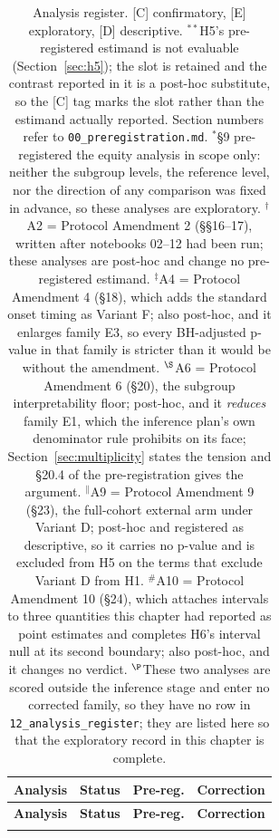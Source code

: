 {\footnotesize\setlength{\tabcolsep}{4pt}
\begin{longtable}{p{5.0cm}lp{1.9cm}p{4.2cm}}
    \caption{Analysis register. [C] confirmatory, [E] exploratory,
    [D] descriptive. $^{**}$H5's pre-registered estimand is not evaluable
    (Section~\ref{sec:h5}); the slot is retained and the contrast reported in
    it is a post-hoc substitute, so the [C] tag marks the slot rather than the
    estimand actually reported. Section numbers refer to
    \texttt{00\_preregistration.md}. $^*$\S9 pre-registered the equity analysis
    in scope only: neither the subgroup levels, the reference level, nor the
    direction of any comparison was fixed in advance, so these analyses are
    exploratory. $^\dagger$A2 = Protocol Amendment 2 (\S\S16--17), written after
    notebooks 02--12 had been run; these analyses are post-hoc and change no
    pre-registered estimand. $^\ddagger$A4 = Protocol Amendment 4 (\S18), which
    adds the standard onset timing as Variant F; also post-hoc, and it enlarges
    family E3, so every BH-adjusted p-value in that family is stricter than it
    would be without the amendment. $^\S$A6 = Protocol Amendment 6 (\S20), the
    subgroup interpretability floor; post-hoc, and it \emph{reduces} family E1,
    which the inference plan's own denominator rule prohibits on its face;
    Section~\ref{sec:multiplicity} states the tension and \S20.4 of the
    pre-registration gives the argument. $^\|$A9 = Protocol Amendment 9 (\S23), the
    full-cohort external arm under Variant D; post-hoc and registered as
    descriptive, so it carries no p-value and is excluded from H5 on the terms
    that exclude Variant D from H1. $^{\#}$A10 = Protocol Amendment 10
    (\S24), which attaches intervals to three quantities this chapter had
    reported as point estimates and completes H6's interval null at its second
    boundary; also post-hoc, and it changes no verdict.
    $^\P$These two analyses are scored
    outside the inference stage and enter no corrected family, so they have no
    row in \texttt{12\_analysis\_register}; they are listed here so that the
    exploratory record in this chapter is complete.}\label{tab:register}\\
    \toprule
    \textbf{Analysis} & \textbf{Status} & \textbf{Pre-reg.} & \textbf{Correction} \\
    \midrule
    \endfirsthead
    \toprule
    \textbf{Analysis} & \textbf{Status} & \textbf{Pre-reg.} & \textbf{Correction} \\
    \midrule
    \endhead
    \bottomrule
    \endfoot


\end{longtable}}
